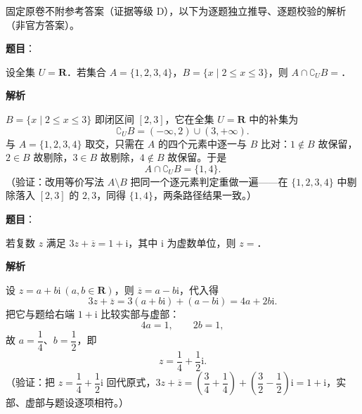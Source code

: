 
\begin{gktip}
固定原卷不附参考答案（证据等级 D），以下为逐题独立推导、逐题校验的解析（非官方答案）。
\end{gktip}

\begin{answer}

\textbf{题目}：

设全集 \(U=\mathbf{R}\)．若集合 \(A=\{1,2,3,4\}\)，\(B=\{x\mid 2\leqslant x\leqslant 3\}\)，则 \(A\cap\complement_{U}B=\)\gkblank{}．

\textbf{解析}

\(B=\{x\mid 2\leqslant x\leqslant 3\}\) 即闭区间 \([2,3]\)，它在全集 \(U=\mathbf{R}\) 中的补集为
\nopagebreak[4]
\[
\complement_{U}B=(-\infty,2)\cup(3,+\infty).
\]
与 \(A=\{1,2,3,4\}\) 取交，只需在 \(A\) 的四个元素中逐一与 \(B\) 比对：\(1\notin B\) 故保留，\(2\in B\) 故剔除，\(3\in B\) 故剔除，\(4\notin B\) 故保留。于是
\nopagebreak[4]
\[
A\cap\complement_{U}B=\{1,4\}.
\]
（验证：改用等价写法 \(A\setminus B\) 把同一个逐元素判定重做一遍——在 \(\{1,2,3,4\}\) 中剔除落入 \([2,3]\) 的 \(2,3\)，同得 \(\{1,4\}\)，两条路径结果一致。）


\end{answer}
\begin{answer}

\textbf{题目}：

若复数 \(z\) 满足 \(3z+\overline{z}=1+\mathrm{i}\)，其中 \(\mathrm{i}\) 为虚数单位，则 \(z=\)\gkblank{}．

\textbf{解析}

设 \(z=a+b\mathrm{i}\ (a,b\in\mathbf{R})\)，则 \(\overline{z}=a-b\mathrm{i}\)，代入得
\nopagebreak[4]
\[
3z+\overline{z}=3(a+b\mathrm{i})+(a-b\mathrm{i})=4a+2b\mathrm{i}.
\]
把它与题给右端 \(1+\mathrm{i}\) 比较实部与虚部：
\nopagebreak[4]
\[
4a=1,\qquad 2b=1,
\]
故 \(a=\dfrac{1}{4}\)、\(b=\dfrac{1}{2}\)，即
\nopagebreak[4]
\[
z=\frac{1}{4}+\frac{1}{2}\mathrm{i}.
\]
（验证：把 \(z=\dfrac{1}{4}+\dfrac{1}{2}\mathrm{i}\) 回代原式，\(3z+\overline{z}=\left(\dfrac{3}{4}+\dfrac{1}{4}\right)+\left(\dfrac{3}{2}-\dfrac{1}{2}\right)\mathrm{i}=1+\mathrm{i}\)，实部、虚部与题设逐项相符。）


\end{answer}
